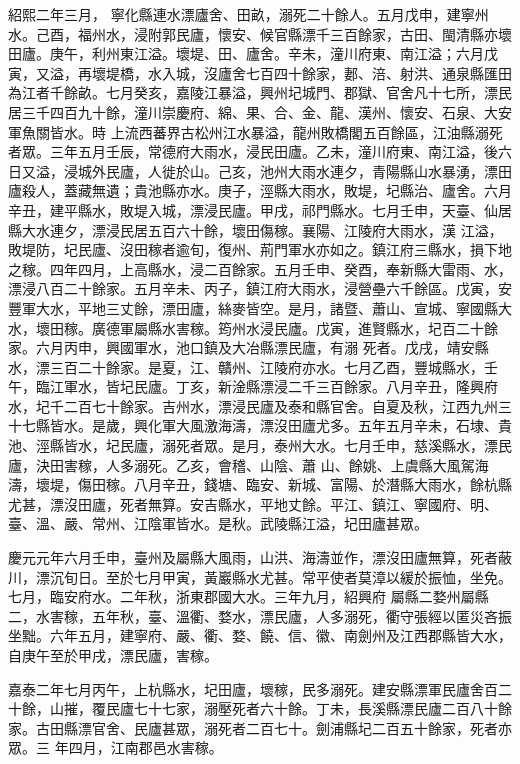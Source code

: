 \begin{pinyinscope}
 紹熙二年三月，
 寧化縣連水漂廬舍、田畝，溺死二十餘人。五月戊申，建寧州水。己酉，福州水，浸附郭民廬，懷安、候官縣漂千三百餘家，古田、閩清縣亦壞田廬。庚午，利州東江溢。壞堤、田、廬舍。辛未，潼川府東、南江溢；六月戊寅，又溢，再壞堤橋，水入城，沒廬舍七百四十餘家，郪、涪、射洪、通泉縣匯田為江者千餘畝。七月癸亥，嘉陵江暴溢，興州圮城門、郡獄、官舍凡十七所，漂民居三千四百九十餘，潼川崇慶府、綿、果、合、金、龍、漢州、懷安、石泉、大安軍魚關皆水。時
 上流西蕃界古松州江水暴溢，龍州敗橋閣五百餘區，江油縣溺死者眾。三年五月壬辰，常德府大雨水，浸民田廬。乙未，潼川府東、南江溢，後六日又溢，浸城外民廬，人徙於山。己亥，池州大雨水連夕，青陽縣山水暴湧，漂田廬殺人，蓋藏無遺；貴池縣亦水。庚子，涇縣大雨水，敗堤，圮縣治、廬舍。六月辛丑，建平縣水，敗堤入城，漂浸民廬。甲戌，祁門縣水。七月壬申，天臺、仙居縣大水連夕，漂浸民居五百六十餘，壞田傷稼。襄陽、江陵府大雨水，漢
 江溢，敗堤防，圮民廬、沒田稼者逾旬，復州、荊門軍水亦如之。鎮江府三縣水，損下地之稼。四年四月，上高縣水，浸二百餘家。五月壬申、癸酉，奉新縣大雷雨、水，漂浸八百二十餘家。五月辛未、丙子，鎮江府大雨水，浸營壘六千餘區。戊寅，安豐軍大水，平地三丈餘，漂田廬，絲麥皆空。是月，諸暨、蕭山、宣城、寧國縣大水，壞田稼。廣德軍屬縣水害稼。筠州水浸民廬。戊寅，進賢縣水，圮百二十餘家。六月丙申，興國軍水，池口鎮及大冶縣漂民廬，有溺
 死者。戊戌，靖安縣水，漂三百二十餘家。是夏，江、贛州、江陵府亦水。七月乙酉，豐城縣水，壬午，臨江軍水，皆圮民廬。丁亥，新淦縣漂浸二千三百餘家。八月辛丑，隆興府水，圮千二百七十餘家。吉州水，漂浸民廬及泰和縣官舍。自夏及秋，江西九州三十七縣皆水。是歲，興化軍大風激海濤，漂沒田廬尤多。五年五月辛未，石埭、貴池、涇縣皆水，圮民廬，溺死者眾。是月，泰州大水。七月壬申，慈溪縣水，漂民廬，決田害稼，人多溺死。乙亥，會稽、山陰、蕭
 山、餘姚、上虞縣大風駕海濤，壞堤，傷田稼。八月辛丑，錢塘、臨安、新城、富陽、於潛縣大雨水，餘杭縣尤甚，漂沒田廬，死者無算。安吉縣水，平地丈餘。平江、鎮江、寧國府、明、臺、溫、嚴、常州、江陰軍皆水。是秋。武陵縣江溢，圮田廬甚眾。



 慶元元年六月壬申，臺州及屬縣大風雨，山洪、海濤並作，漂沒田廬無算，死者蔽川，漂沉旬日。至於七月甲寅，黃巖縣水尤甚。常平使者莫漳以緩於振恤，坐免。七月，臨安府水。二年秋，浙東郡國大水。三年九月，紹興府
 屬縣二婺州屬縣二，水害稼，五年秋，臺、溫衢、婺水，漂民廬，人多溺死，衢守張經以匿災吝振坐黜。六年五月，建寧府、嚴、衢、婺、饒、信、徽、南劍州及江西郡縣皆大水，自庚午至於甲戌，漂民廬，害稼。



 嘉泰二年七月丙午，上杭縣水，圮田廬，壞稼，民多溺死。建安縣漂軍民廬舍百二十餘，山摧，覆民廬七十七家，溺壓死者六十餘。丁未，長溪縣漂民廬二百八十餘家。古田縣漂官舍、民廬甚眾，溺死者二百七十。劍浦縣圮二百五十餘家，死者亦眾。三
 年四月，江南郡邑水害稼。




\end{pinyinscope}
